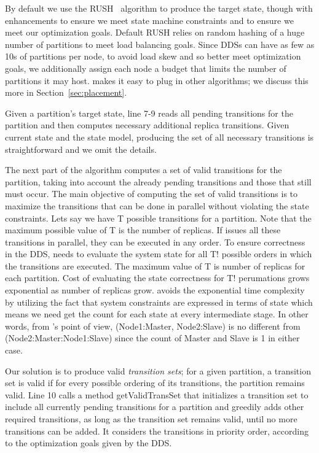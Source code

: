 By default we use the RUSH~\cite{honicky04} algorithm to produce the target state,
though with enhancements to ensure we meet state machine constraints and to
ensure we meet our optimization goals.  Default RUSH relies on
random hashing of a huge number of partitions to meet load balancing goals.
Since DDSs can have as few as 10s of partitions per node, to avoid load skew and
so better meet optimization goals, we
additionally assign each node a budget that limits the number of partitions it
may host.  \helix makes it easy to plug in other algorithms; we
discuss this more in Section~\ref{sec:placement}.

Given a partition's target state, line 7-9 reads all pending transitions for the
partition and then computes necessary additional replica transitions.
Given current state and the state model, producing the set of all necessary
transitions is straightforward
and we omit the details.


The next part of the algorithm computes a set of valid transitions for the
partition, taking into account the already pending transitions and those that
still must occur. The main objective of computing the set of valid transitions is to maximize the 
transitions that can be done in parallel without violating the state constraints. 
Lets say we have T possible transitions for a partition. Note that the maximum possible value of T
 is the number of replicas. If \helix issues all these transitions in parallel,
 they can be executed in any order.
To ensure correctness in the DDS, \helix needs to evaluate the system state
for all T! possible orders in which the transitions are executed. The
maximum value of T is number of replicas for each partition. Cost of evaluating
the state correctness for T! perumations grows exponential as number of replicas
grow. \helix avoids the exponential time complexity by utilizing the fact that
system constraints are expressed in terms of state which means we need get the count for each state at every intermediate stage.
 In other words, from \helix's point of view, (Node1:Master, Node2:Slave) is no
 different from (Node2:Master:Node1:Slave) since the count of Master and Slave is 1 in either case.

Our solution is to produce valid \emph{transition sets}; for a given
partition, a transition set is valid if
for every possible ordering of its transitions, the partition remains valid.    
Line 10 calls a method getValidTransSet that initializes a
transition set to include all
currently pending transitions for a partition and greedily adds other required
transitions, as long as the transition set remains valid, until no more
transitions can be added.  It considers the transitions in priority order,
according to the optimization goals given by the DDS.

